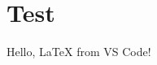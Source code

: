 \documentclass{article}
\begin{document}
\section{Test}
Hello, LaTeX from VS Code!

\lipsum[1]
\end{document}
